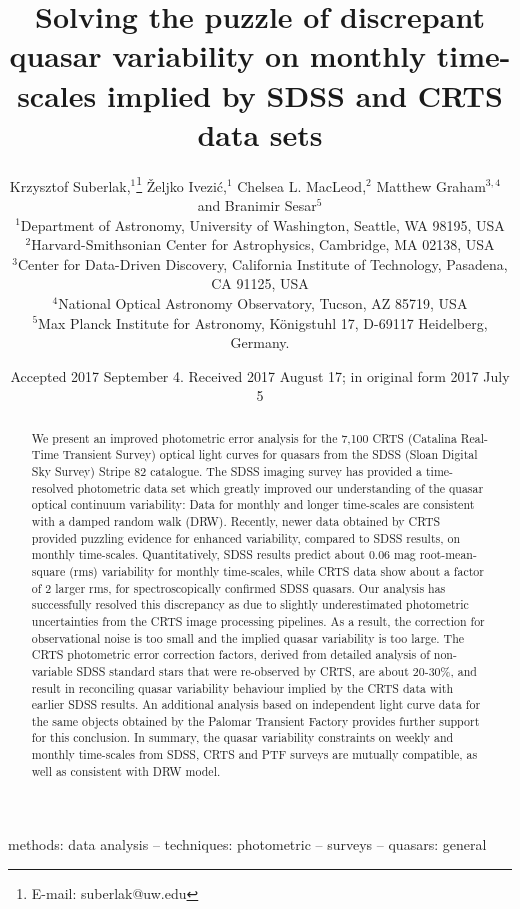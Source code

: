 \documentclass[fleqn,usenatbib]{mnras}
\title[Quasar variability]{Solving the puzzle of discrepant quasar variability on monthly time-scales implied by SDSS and CRTS data sets}
\author[K. Suberlak et al.]{
Krzysztof Suberlak,$^{1}$\thanks{E-mail: suberlak@uw.edu}
\v{Z}eljko Ivezi\'c,$^{1}$
Chelsea L. MacLeod,$^{2}$
Matthew Graham$^{3,4}$
\newauthor
$\, \,  $and Branimir Sesar$^{5}$
\\
$^{1}$Department of Astronomy, University of Washington, Seattle, WA 98195, USA\\
$^{2}$Harvard-Smithsonian Center for Astrophysics, Cambridge, MA 02138, USA\\
$^{3}$Center for Data-Driven Discovery, California Institute of Technology, Pasadena, CA 91125, USA\\
$^{4}$National Optical Astronomy Observatory, Tucson, AZ 85719, USA\\
$^{5}$Max Planck Institute for Astronomy, K\"{o}nigstuhl 17, D-69117 Heidelberg, Germany. 
}
\date{Accepted 2017 September 4. Received 2017 August 17; in original form 2017 July 5}
\begin{document}
\label{firstpage}
\pagerange{\pageref{firstpage}--\pageref{lastpage}}
\maketitle

\begin{abstract}
We present an improved photometric error analysis for the 7,100 CRTS (Catalina Real-Time Transient Survey)  optical  light curves for quasars from the SDSS (Sloan Digital Sky Survey) Stripe 82 catalogue. The SDSS imaging survey  has provided a time-resolved photometric  data set which greatly improved our understanding of the quasar optical continuum variability: Data for monthly and longer time-scales  are consistent with a damped random walk (DRW). Recently, newer data  obtained by CRTS provided  puzzling evidence for enhanced variability, compared to SDSS  results, on monthly time-scales. Quantitatively, SDSS results predict  about 0.06 mag root-mean-square (rms) variability  for monthly time-scales, while CRTS data show about a factor of 2 larger rms, for spectroscopically confirmed SDSS quasars. Our analysis has successfully resolved this discrepancy as due to slightly underestimated photometric uncertainties from the CRTS image processing pipelines. As a result, the correction for observational noise is too small and the implied quasar variability is too large. The CRTS photometric error correction factors, derived from detailed analysis of non-variable SDSS standard stars that were re-observed by CRTS, are about 20-30\%, and result in reconciling  quasar variability behaviour implied by the CRTS data with earlier SDSS results. An additional analysis based on independent light curve data for the same objects obtained by the Palomar Transient Factory provides further support for this conclusion. In summary, the quasar variability constraints on weekly and monthly time-scales from SDSS, CRTS and PTF surveys are mutually compatible, as well as consistent with DRW model.
\end{abstract}

\begin{keywords}
methods: data analysis -- techniques: photometric -- surveys -- quasars: general

\end{keywords}



\end{document}
